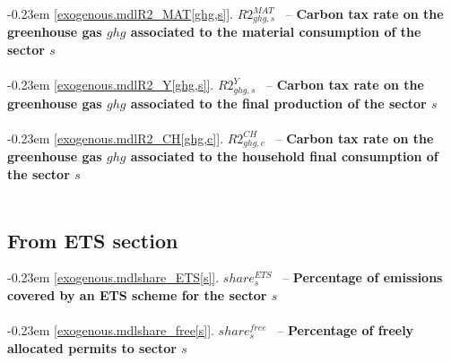 \documentclass[12pt]{article}
\numberwithin{equation}{section}
\begin{document}
\noindent \kern-0.23em \noindent \begingroup {} \label{exogenous.mdlR2_MAT[ghg,s]}\ref{exogenous.mdlR2_MAT[ghg,s]}.
         
        \ensuremath{R2^{MAT}_{ghg, s}}~ \endgroup -- \noindent \textbf{Carbon tax rate on the greenhouse gas $ghg$ associated to the material consumption of the sector $s$}  \\ \\[-8pt]


\noindent \kern-0.23em \noindent \begingroup {} \label{exogenous.mdlR2_Y[ghg,s]}\ref{exogenous.mdlR2_Y[ghg,s]}.
         
        \ensuremath{R2^{Y}_{ghg, s}}~ \endgroup -- \noindent \textbf{Carbon tax rate on the greenhouse gas $ghg$ associated to the final production of the sector $s$}  \\ \\[-8pt]


\noindent \kern-0.23em \noindent \begingroup {} \label{exogenous.mdlR2_CH[ghg,c]}\ref{exogenous.mdlR2_CH[ghg,c]}.
         
        \ensuremath{R2^{CH}_{ghg, c}}~ \endgroup -- \noindent \textbf{Carbon tax rate on the greenhouse gas $ghg$ associated to the household final consumption of the sector $s$}  \\ \\[-8pt]












\subsection{From ETS section}




\noindent \kern-0.23em \noindent \begingroup {} \label{exogenous.mdlshare_ETS[s]}\ref{exogenous.mdlshare_ETS[s]}.
         
        \ensuremath{share^{ETS}_{s}}~ \endgroup -- \noindent \textbf{Percentage of emissions covered by an ETS scheme for the sector $s$}  \\ \\[-8pt]



\noindent \kern-0.23em \noindent \begingroup {} \label{exogenous.mdlshare_free[s]}\ref{exogenous.mdlshare_free[s]}.
         
        \ensuremath{share^{free}_{s}}~ \endgroup -- \noindent \textbf{Percentage of freely allocated permits to sector $s$}  \\ \\[-8pt]
\end{document}
